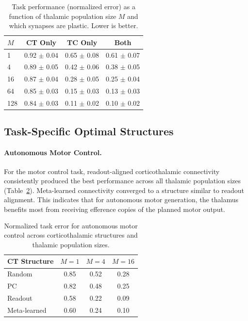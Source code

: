 \documentclass[11pt]{article}
\begin{document}
\begin{table}[htbp]
\centering
\caption{Task performance (normalized error) as a function of thalamic population size $M$ and which synapses are plastic. Lower is better.}
\label{tab:learning_rule}
\begin{tabular}{lccc}
\toprule
\textbf{$M$} & \textbf{CT Only} & \textbf{TC Only} & \textbf{Both} \\
\midrule
1 & 0.92 $\pm$ 0.04 & 0.65 $\pm$ 0.08 & 0.61 $\pm$ 0.07 \\
4 & 0.89 $\pm$ 0.05 & 0.42 $\pm$ 0.06 & 0.38 $\pm$ 0.05 \\
16 & 0.87 $\pm$ 0.04 & 0.28 $\pm$ 0.05 & 0.25 $\pm$ 0.04 \\
64 & 0.85 $\pm$ 0.03 & 0.15 $\pm$ 0.03 & 0.13 $\pm$ 0.03 \\
128 & 0.84 $\pm$ 0.03 & 0.11 $\pm$ 0.02 & 0.10 $\pm$ 0.02 \\
\bottomrule
\end{tabular}
\end{table}

\subsection{Task-Specific Optimal Structures}

\paragraph{Autonomous Motor Control.} For the motor control task, readout-aligned corticothalamic connectivity consistently produced the best performance across all thalamic population sizes (Table~\ref{tab:motor_task}). Meta-learned connectivity converged to a structure similar to readout alignment. This indicates that for autonomous motor generation, the thalamus benefits most from receiving efference copies of the planned motor output.

\begin{table}[htbp]
\centering
\caption{Normalized task error for autonomous motor control across corticothalamic structures and thalamic population sizes.}
\label{tab:motor_task}
\begin{tabular}{lccc}
\toprule
\textbf{CT Structure} & \textbf{$M=1$} & \textbf{$M=4$} & \textbf{$M=16$} \\
\midrule
Random & 0.85 & 0.52 & 0.28 \\
PC & 0.82 & 0.48 & 0.25 \\
Readout & 0.58 & 0.22 & 0.09 \\
Meta-learned & 0.60 & 0.24 & 0.10 \\
\bottomrule
\end{tabular}
\end{table}
\end{document}
